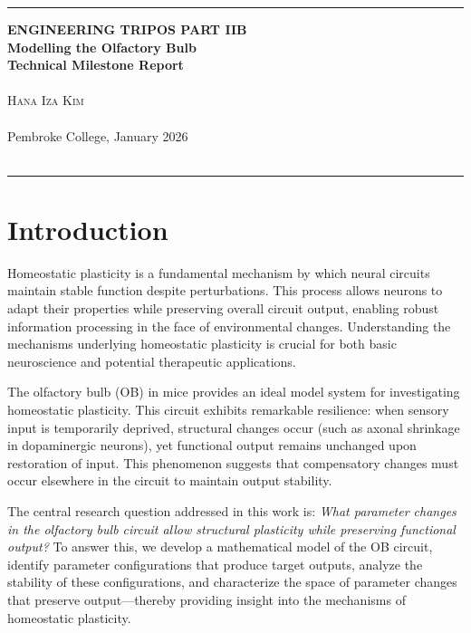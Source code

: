 \documentclass[12pt]{article}
\begin{document}
\noindent
\rule{15.7cm}{0.5mm}


\begin{center}
{\Large \bf ENGINEERING TRIPOS PART IIB \\
\bigskip}
\vspace{2cm}
{\LARGE \bf Modelling the Olfactory Bulb\\
\bigskip}
{\Large \bf  Technical Milestone Report \\\hfill \\}
\bigskip
\textsc{\Large Hana Iza Kim} \\\hfill\\
{\large Pembroke College, January 2026}\\
\hfill\\
\end{center}
\rule{15.7cm}{0.5mm}
\vfill
\bigskip
\vfill
\thispagestyle{empty} %
\pagebreak
\setcounter{page}{1}


\newpage

\section{Introduction}

Homeostatic plasticity is a fundamental mechanism by which neural circuits maintain stable function despite perturbations. This process allows neurons to adapt their properties while preserving overall circuit output, enabling robust information processing in the face of environmental changes. Understanding the mechanisms underlying homeostatic plasticity is crucial for both basic neuroscience and potential therapeutic applications.

The olfactory bulb (OB) in mice provides an ideal model system for investigating homeostatic plasticity. This circuit exhibits remarkable resilience: when sensory input is temporarily deprived, structural changes occur (such as axonal shrinkage in dopaminergic neurons), yet functional output remains unchanged upon restoration of input. This phenomenon suggests that compensatory changes must occur elsewhere in the circuit to maintain output stability.

The central research question addressed in this work is: \textit{What parameter changes in the olfactory bulb circuit allow structural plasticity while preserving functional output?} To answer this, we develop a mathematical model of the OB circuit, identify parameter configurations that produce target outputs, analyze the stability of these configurations, and characterize the space of parameter changes that preserve output—thereby providing insight into the mechanisms of homeostatic plasticity.
\end{document}
